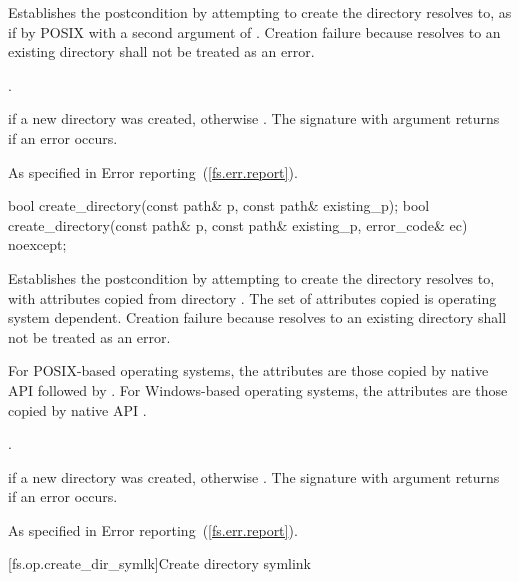 \begin{itemdescr}
\pnum
\effects Establishes the postcondition by attempting to create the
  directory  resolves to, as if by POSIX  with a second argument of
  . Creation
  failure because  resolves to an existing directory shall not be
  treated as an error.

\pnum
\postconditions {}.

\pnum
\returns {} if a new directory was created, otherwise .
  The signature with argument  returns  if an error occurs.

\pnum
\throws As specified in Error reporting~(\ref{fs.err.report}).
\end{itemdescr}

%
\begin{itemdecl}
bool create_directory(const path& p, const path& existing_p);
bool create_directory(const path& p, const path& existing_p, error_code& ec) noexcept;
\end{itemdecl}

\begin{itemdescr}
\pnum
\effects Establishes the postcondition by attempting to create the
  directory  resolves to, with
  attributes copied from directory . The set of attributes
  copied is operating system dependent. Creation failure because  resolves to an existing directory shall not be
  treated as an error.
\begin{note} For POSIX-based operating systems, the
      attributes are those copied by native API 
      followed by . For
      Windows-based operating systems, the attributes are those copied by native
      API .
\end{note}

\pnum
\postconditions {}.

\pnum
\returns {} if a new directory was created, otherwise .
  The signature with argument  returns  if an error occurs.

\pnum
\throws As specified in Error reporting~(\ref{fs.err.report}).
\end{itemdescr}


[fs.op.create_dir_symlk]{Create directory symlink}

